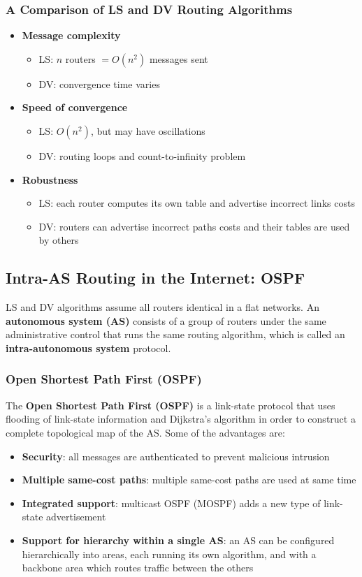 \documentclass{article}
\begin{document}
\subsubsection*{A Comparison of LS and DV Routing Algorithms}
\begin{itemize}
    \item \textbf{Message complexity}
        \begin{itemize}
            \item LS: $ n $ routers $ = O(n^2)$ messages sent
            \item DV: convergence time varies
        \end{itemize}
    \item \textbf{Speed of convergence}
        \begin{itemize}
            \item LS: $ O(n^2) $, but may have oscillations
            \item DV: routing loops and count-to-infinity problem
        \end{itemize}
    \item \textbf{Robustness}
        \begin{itemize}
            \item LS: each router computes its own table and advertise incorrect links costs
            \item DV: routers can advertise incorrect paths costs and their tables are used by others
        \end{itemize}
\end{itemize}

\subsection{Intra-AS Routing in the Internet: OSPF}
LS and DV algorithms assume all routers identical in a flat networks.
An \textbf{autonomous system (AS)} consists of a group of routers under the same administrative control that runs the same routing algorithm, which is called an \textbf{intra-autonomous system} protocol.
\subsubsection{Open Shortest Path First (OSPF)}
The \textbf{Open Shortest Path First (OSPF)} is a link-state protocol that uses flooding of link-state information and Dijkstra's algorithm in order to construct a complete topological map of the AS.
Some of the advantages are:
\begin{itemize}
    \item \textbf{Security}: all messages are authenticated to prevent malicious intrusion
    \item \textbf{Multiple same-cost paths}: multiple same-cost paths are used at same time
    \item \textbf{Integrated support}: multicast OSPF (MOSPF) adds a new type of link-state advertisement
    \item \textbf{Support for hierarchy within a single AS}: an AS can be configured hierarchically into areas, each running its own algorithm, and with a backbone area which routes traffic between the others
\end{itemize}
\end{document}
